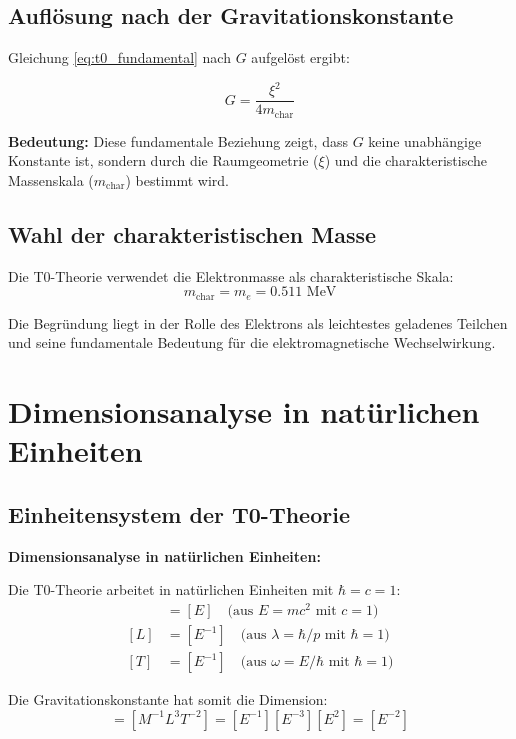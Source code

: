 \documentclass[12pt,a4paper]{article}
\begin{document}
	\subsection{Auflösung nach der Gravitationskonstante}
	
	Gleichung \eqref{eq:t0_fundamental} nach $G$ aufgelöst ergibt:
	
	\begin{equation}
		G = \frac{\xi^2}{4 m_{\text{char}}}
		\label{eq:g_fundamental}
	\end{equation}
	
	\textbf{Bedeutung:} Diese fundamentale Beziehung zeigt, dass $G$ keine unabhängige Konstante ist, sondern durch die Raumgeometrie ($\xi$) und die charakteristische Massenskala ($m_{\text{char}}$) bestimmt wird.
	
	\subsection{Wahl der charakteristischen Masse}
	
	Die T0-Theorie verwendet die Elektronmasse als charakteristische Skala:
	\begin{equation}
		m_{\text{char}} = m_e = 0.511 \text{ MeV}
		\label{eq:characteristic_mass}
	\end{equation}
	
	Die Begründung liegt in der Rolle des Elektrons als leichtestes geladenes Teilchen und seine fundamentale Bedeutung für die elektromagnetische Wechselwirkung.
	
	\section{Dimensionsanalyse in natürlichen Einheiten}
	
	\subsection{Einheitensystem der T0-Theorie}
	
	\begin{dimensional}
		\textbf{Dimensionsanalyse in natürlichen Einheiten:}
		
		Die T0-Theorie arbeitet in natürlichen Einheiten mit $\hbar = c = 1$:
		\begin{align}
			[M] &= [E] \quad \text{(aus } E = mc^2 \text{ mit } c = 1\text{)} \\
			[L] &= [E^{-1}] \quad \text{(aus } \lambda = \hbar/p \text{ mit } \hbar = 1\text{)} \\
			[T] &= [E^{-1}] \quad \text{(aus } \omega = E/\hbar \text{ mit } \hbar = 1\text{)}
		\end{align}
		
		Die Gravitationskonstante hat somit die Dimension:
		\begin{equation}
			[G] = [M^{-1}L^3T^{-2}] = [E^{-1}][E^{-3}][E^2] = [E^{-2}]
		\end{equation}
	\end{dimensional}
	
\end{document}
